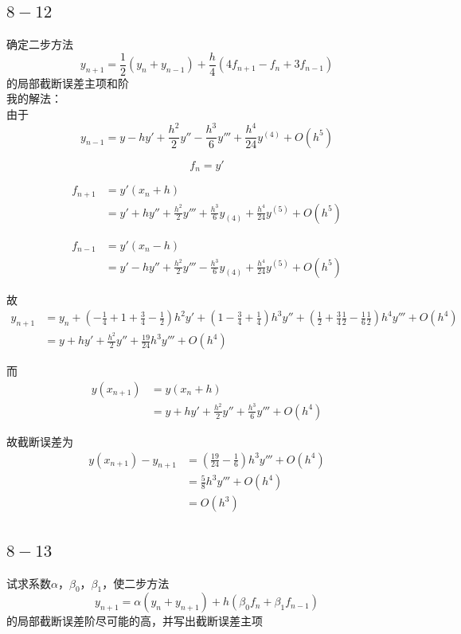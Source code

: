 \documentclass{article}
\begin{document}
\begin{CJK*}{UTF8}{gbsn}
\subsection{$8-12$}
确定二步方法
\[ y_{n + 1} = \frac{1}{2}(y_n + y_{n - 1}) + \frac{h}{4}(4f_{n + 1} - f_n + 3f_{n - 1}) \]
的局部截断误差主项和阶 \\

我的解法： \\
由于
\[ y_{n - 1} = y - hy' + \frac{h^2}{2}y'' - \frac{h^3}{6}y''' + \frac{h^4}{24}y^{(4)} + O(h^5) \]

\[ f_n = y' \]

\[
\begin{aligned}
f_{n + 1} &= y'(x_n + h) \\
&= y' + hy'' + \frac{h^2}{2}y''' + \frac{h^3}{6}y_{(4)} + \frac{h^4}{24}y^{(5)} + O(h^5)
\end{aligned}
\]

\[
\begin{aligned}
f_{n - 1} &= y'(x_n - h) \\
&= y' - hy'' + \frac{h^2}{2}y''' - \frac{h^3}{6}y_{(4)} + \frac{h^4}{24}y^{(5)} + O(h^5)
\end{aligned}
\]

故
\[
\begin{aligned}
y_{n + 1} &= y_n + \left( -\frac{1}{4} + 1 + \frac{3}{4} - \frac{1}{2} \right)h^2y' + \left( 1 - \frac{3}{4} + \frac{1}{4} \right)h^3y'' + \left( \frac{1}{2} + \frac{3}{4}\frac{1}{2} - \frac{1}{6}\frac{1}{2} \right)h^4y''' + O(h^4) \\
&= y + hy' + \frac{h^2}{2}y'' + \frac{19}{24}h^3y''' + O(h^4)
\end{aligned}
\]

而
\[
\begin{aligned}
y(x_{n + 1}) &= y(x_n + h) \\
&= y + hy' + \frac{h^2}{2}y'' + \frac{h^3}{6}y''' + O(h^4)
\end{aligned}
\]

故截断误差为
\[
\begin{aligned}
y(x_{n + 1}) - y_{n + 1} &= \left(\frac{19}{24} - \frac{1}{6}\right)h^3y''' + O(h^4) \\
&= \frac{5}{8}h^3y''' + O(h^4) \\
&= O(h^3)
\end{aligned}
\]

\subsection{$8-13$}
试求系数$\alpha$，$\beta_0$，$\beta_1$，使二步方法
\[ y_{n + 1} = \alpha(y_n + y_{n + 1}) + h(\beta_0f_n + \beta_1f_{n - 1}) \]
的局部截断误差阶尽可能的高，并写出截断误差主项 \\


\end{CJK*}
\end{document}

